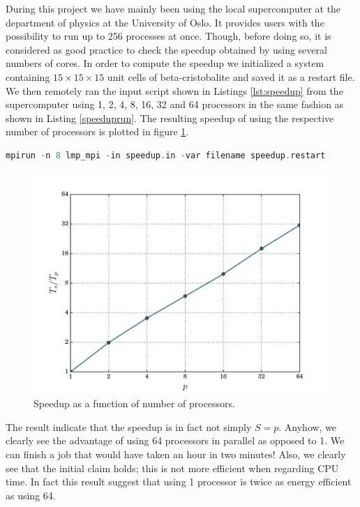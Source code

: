 \documentclass[twoside,english]{uiofysmaster}
\begin{document}
During this project we have mainly been using the local supercomputer at the department of physics at the University of Oslo. It provides users with the possibility to run  up to 256 processes at once. Though, before doing so, it is considered as good practice to check the speedup obtained by using several numbers of cores.
In order to compute the speedup we initialized a system containing $15\times15\times15$ unit cells of beta-cristobalite and saved it as a restart file. 
We then remotely ran the input script shown in Listings \ref{lst:speedup} from the supercomputer using 1, 2, 4, 8, 16, 32 and 64 processors in the same fashion as shown in Listing \ref{speeduprun}.  
The resulting speedup of using the respective number of processors is plotted in figure \ref{fig:speedup15x15}.



\begin{lstlisting}[caption={Command used to excecute the input script speedup.in on 8 parallel processors and set the filename variable to speedup.restart.}, label={speeduprun}, language=c++]
mpirun -n 8 lmp_mpi -in speedup.in -var filename speedup.restart
\end{lstlisting}
\begin{figure}[H]
	\centering
	\includegraphics[width=0.7\linewidth]{figures/speedup/15x15.pdf}
	\caption{Speedup as a function of number of processors.}
	\label{fig:speedup15x15}
\end{figure}
The result indicate that the speedup is in fact not simply $S=p$. 
Anyhow, we clearly see the advantage of using 64 processors in parallel as opposed to 1. 
We can finish a job that would have taken an hour in two minutes!
Also, we clearly see that the initial claim holds; this is not more efficient when regarding CPU time. 
In fact this result suggest that using 1 processor is twice as energy efficient as using 64. 
\end{document}

